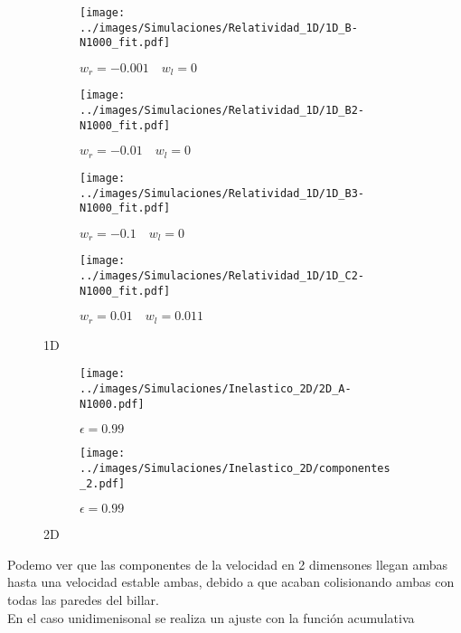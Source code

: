 \documentclass[11pt, spanish]{article}
\begin{document}
\begin{figure}[h]
    \begin{subfigure}[b]{0.5\textwidth}
        \centering
        \texttt{[image: ../images/Simulaciones/Relatividad\_1D/1D\_B-N1000\_fit.pdf]}
        \caption{$w_r = -0.001 \quad w_l = 0$}
    \end{subfigure}
    \hfill
    \begin{subfigure}[b]{0.5\textwidth}
        \centering
        \texttt{[image: ../images/Simulaciones/Relatividad\_1D/1D\_B2-N1000\_fit.pdf]}
        \caption{$w_r = -0.01 \quad w_l = 0$}
    \end{subfigure}
    \hfill
    \begin{subfigure}[b]{0.5\textwidth}
        \centering
        \texttt{[image: ../images/Simulaciones/Relatividad\_1D/1D\_B3-N1000\_fit.pdf]}
        \caption{$w_r = -0.1 \quad w_l = 0$}
    \end{subfigure}
    \hfill
    \begin{subfigure}[b]{0.5\textwidth}
        \centering
        \texttt{[image: ../images/Simulaciones/Relatividad\_1D/1D\_C2-N1000\_fit.pdf]}
        \caption{$w_r = 0.01 \quad w_l = 0.011$}
    \end{subfigure}
    \caption{1D}
    \label{fig:ajuste_1D_relativity}
\end{figure}

\begin{figure}[H]
    \begin{subfigure}[b]{0.5\textwidth}
        \centering
        \texttt{[image: ../images/Simulaciones/Inelastico\_2D/2D\_A-N1000.pdf]}
        \caption{\( \epsilon = 0.99 \)}
    \end{subfigure}
    \hfill
    \begin{subfigure}[b]{0.5\textwidth}
        \centering
        \texttt{[image: ../images/Simulaciones/Inelastico\_2D/componentes\_2.pdf]}
        \caption{\( \epsilon = 0.99 \)}
    \end{subfigure}
    \caption{2D}
    \label{fig:2DR_A-N1000_Ine_velocidades}
\end{figure}

Podemo ver que las componentes de la velocidad en 2 dimensones llegan ambas hasta una velocidad estable ambas, debido a que acaban colisionando ambas con todas las paredes del billar. \\

En el caso unidimenisonal se realiza un ajuste con la función acumulativa 
\end{document}
